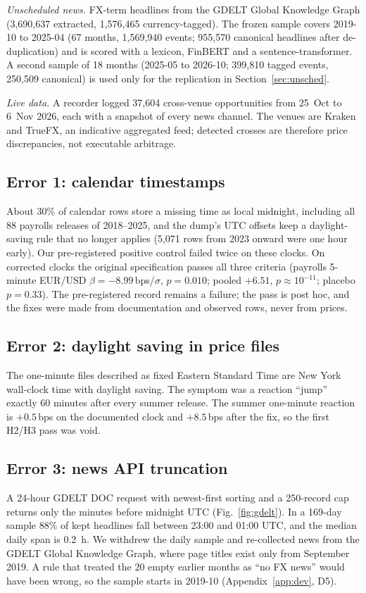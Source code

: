 \documentclass[conference]{IEEEtran}
\newcommand{\bps}{\,bps}
\begin{document}
\emph{Unscheduled news.} FX-term headlines from the GDELT Global Knowledge Graph (3,690,637
extracted, 1,576,465 currency-tagged). The frozen sample covers 2019-10 to 2025-04 (67 months,
1,569,940 events; 955,570 canonical headlines after de-duplication) and is scored with a lexicon,
FinBERT and a sentence-transformer. A second sample of 18 months (2025-05 to 2026-10; 399,810
tagged events, 250,509 canonical) is used only for the replication in Section~\ref{sec:unsched}.

\emph{Live data.} A recorder logged 37,604 cross-venue opportunities from 25~Oct to 6~Nov 2026,
each with a snapshot of every news channel. The venues are Kraken and TrueFX, an indicative
aggregated feed; detected crosses are therefore price discrepancies, not executable arbitrage.

\subsection{Error 1: calendar timestamps}
About 30\% of calendar rows store a missing time as local midnight, including all 88 payrolls
releases of 2018--2025, and the dump's UTC offsets keep a daylight-saving rule that no longer
applies (5,071 rows from 2023 onward were one hour early). Our pre-registered positive control
failed twice on these clocks. On corrected clocks the original specification passes all three
criteria (payrolls 5-minute EUR/USD $\beta=-8.99$\bps/$\sigma$, $p=0.010$; pooled
$+6.51$, $p\approx10^{-11}$; placebo $p=0.33$). The pre-registered record remains a failure; the
pass is post hoc, and the fixes were made from documentation and observed rows, never from prices.

\subsection{Error 2: daylight saving in price files}
The one-minute files described as fixed Eastern Standard Time are New York wall-clock time with
daylight saving. The symptom was a reaction ``jump'' exactly 60 minutes after every summer
release. The summer one-minute reaction is $+0.5$\bps{} on the documented clock and $+8.5$\bps{}
after the fix, so the first H2/H3 pass was void.

\subsection{Error 3: news API truncation}
A 24-hour GDELT DOC request with newest-first sorting and a 250-record cap returns only the
minutes before midnight UTC (Fig.~\ref{fig:gdelt}). In a 169-day sample 88\% of kept headlines
fall between 23:00 and 01:00 UTC, and the median daily span is 0.2~h. We withdrew the daily
sample and re-collected news from the GDELT Global Knowledge Graph, where page titles exist only
from September 2019. A rule that treated the 20 empty earlier months as ``no FX news'' would have
been wrong, so the sample starts in 2019-10 (Appendix~\ref{app:dev}, D5).
\end{document}
